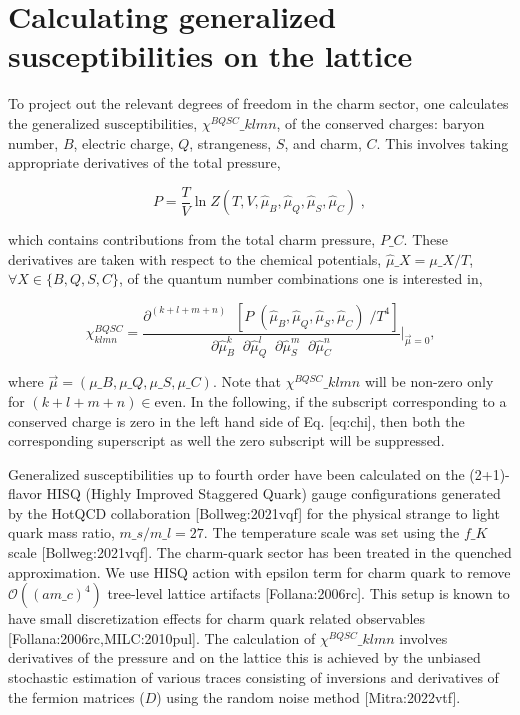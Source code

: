 \documentclass[11pt,a4paper]{article}
\begin{document}
\section{Calculating generalized susceptibilities on the lattice}

To project out the relevant degrees of freedom in the charm sector, one calculates the generalized susceptibilities, ${\chi^{BQSC}\_{klmn}}$, of the conserved charges: baryon number, $B$, electric charge, $Q$, strangeness, $S$, and charm, $C$. This involves taking appropriate derivatives of the total pressure,

$$P=\frac{T}{V}\ln Z(T,V,\hat{\mu}_B,\hat{\mu}_Q,\hat{\mu}_S,\hat{\mu}_C)
    \; ,$$

which contains contributions from the total charm pressure, $P\_C$. These derivatives are taken with respect to the chemical potentials, ${\hat{\mu}\_X = \mu\_X/T}$, ${\forall X \in \{B, Q, S, C\}}$, of the quantum number combinations one is interested in,

$${\chi^{BQSC}_{klmn}=\dfrac{\partial^{(k+l+m+n)}\;\;[P\;(\hat{\mu}_B,\hat{\mu}_Q,\hat{\mu}_S,\hat{\mu}_C)\;/T^4]}{\partial\hat{\mu}^{k}_B\;\;\partial\hat{\mu}^{l}_Q\;\;\partial\hat{\mu}^{m}_S\;\;\partial\hat{\mu}^{n}_C}}\bigg|_{\overrightarrow{\mu}=0}\text{,}$$

where $\vec{\mu}=(\mu\_B, \mu\_Q, \mu\_S, \mu\_C)$. 
Note that ${\chi^{BQSC}\_{klmn}}$ will be non-zero only for ${(k+l+m+n) \in \text{even}}$. In the following, if the subscript corresponding to a conserved charge is zero in the
left hand side of Eq. [eq:chi], then both the corresponding superscript as well the zero subscript will be suppressed.

Generalized susceptibilities up to fourth order have been calculated on the (2+1)-flavor HISQ (Highly Improved Staggered Quark) gauge configurations generated by the HotQCD collaboration [Bollweg:2021vqf] for the physical strange to light quark mass ratio, ${m\_s/m\_{l}}=27$. The temperature scale was set using the $f\_K$ scale [Bollweg:2021vqf]. 
The charm-quark sector has been treated in the quenched approximation. We use HISQ action with epsilon term for charm quark to remove $\mathcal{O}((am\_c)^4)$ tree-level lattice artifacts [Follana:2006rc]. This setup is known to have small discretization effects for charm quark related observables [Follana:2006rc,MILC:2010pul]. The calculation of $\chi^{BQSC}\_{klmn}$ involves derivatives of the pressure and on the lattice this is achieved by the unbiased stochastic estimation of various traces  consisting of inversions and derivatives  of the fermion matrices ($D$)  using the random noise method [Mitra:2022vtf].
\end{document}
